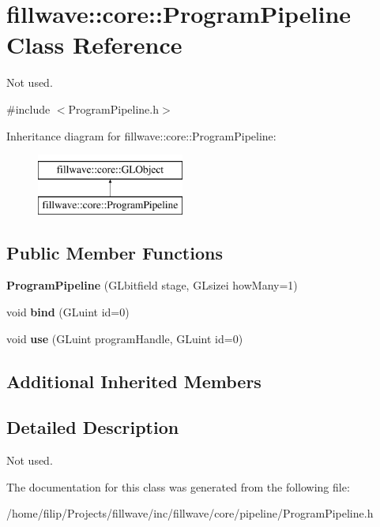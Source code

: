 \hypertarget{classfillwave_1_1core_1_1ProgramPipeline}{}\section{fillwave\+:\+:core\+:\+:Program\+Pipeline Class Reference}
\label{classfillwave_1_1core_1_1ProgramPipeline}


Not used.  




{\ttfamily \#include $<$Program\+Pipeline.\+h$>$}

Inheritance diagram for fillwave\+:\+:core\+:\+:Program\+Pipeline\+:\begin{figure}[H]
\begin{center}
\leavevmode
\includegraphics[height=2.000000cm]{classfillwave_1_1core_1_1ProgramPipeline}
\end{center}
\end{figure}
\subsection*{Public Member Functions}
\begin{DoxyCompactItemize}
\item 
\hypertarget{classfillwave_1_1core_1_1ProgramPipeline_a236be2c6be0b0b4ca96601e8af272500}{}{\bfseries Program\+Pipeline} (G\+Lbitfield stage, G\+Lsizei how\+Many=1)\label{classfillwave_1_1core_1_1ProgramPipeline_a236be2c6be0b0b4ca96601e8af272500}

\item 
\hypertarget{classfillwave_1_1core_1_1ProgramPipeline_ac75984091fc99cd2ba64047a0a59bb93}{}void {\bfseries bind} (G\+Luint id=0)\label{classfillwave_1_1core_1_1ProgramPipeline_ac75984091fc99cd2ba64047a0a59bb93}

\item 
\hypertarget{classfillwave_1_1core_1_1ProgramPipeline_a43466c4a43a3ac089a857be60856b7e6}{}void {\bfseries use} (G\+Luint program\+Handle, G\+Luint id=0)\label{classfillwave_1_1core_1_1ProgramPipeline_a43466c4a43a3ac089a857be60856b7e6}

\end{DoxyCompactItemize}
\subsection*{Additional Inherited Members}


\subsection{Detailed Description}
Not used. 

The documentation for this class was generated from the following file\+:\begin{DoxyCompactItemize}
\item 
/home/filip/\+Projects/fillwave/inc/fillwave/core/pipeline/Program\+Pipeline.\+h\end{DoxyCompactItemize}
